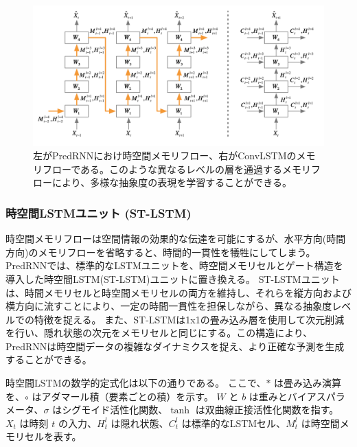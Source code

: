         \begin{figure}[htbp]
          \begin{center}
            \includegraphics[width=\textwidth]{figures/videoprediction/predrnn_memory.png}
            \caption{左がPredRNNにおけ時空間メモリフロー、右がConvLSTMのメモリフローである。このような異なるレベルの層を通過するメモリフローにより、多様な抽象度の表現を学習することができる。}
            \label{fig:predrnn}
          \end{center}
        \end{figure}
        
        \subsubsection{時空間LSTMユニット (ST-LSTM)}
          時空間メモリフローは空間情報の効果的な伝達を可能にするが、水平方向(時間方向)のメモリフローを省略すると、時間的一貫性を犠牲にしてしまう。
          PredRNNでは、標準的なLSTMユニットを、時空間メモリセルとゲート構造を導入した時空間LSTM(ST-LSTM)ユニットに置き換える。
          ST-LSTMユニットは、時間メモリセルと時空間メモリセルの両方を維持し、それらを縦方向および横方向に流すことにより、一定の時間一貫性を担保しながら、異なる抽象度レベルでの特徴を捉える。
          また、ST-LSTMは1x1の畳み込み層を使用して次元削減を行い、隠れ状態の次元をメモリセルと同じにする。この構造により、PredRNNは時空間データの複雑なダイナミクスを捉え、より正確な予測を生成することができる。

          時空間LSTMの数学的定式化は以下の通りである。
          ここで、\( \ast \) は畳み込み演算を、\( \circ \) はアダマール積（要素ごとの積）を示す。
          \( W \) と \( b \) は重みとバイアスパラメータ、\( \sigma \) はシグモイド活性化関数、\( \tanh \) は双曲線正接活性化関数を指す。
          \( X_t \) は時刻 \( t \) の入力、\( H_t^l \) は隠れ状態、\( C_t^l \) は標準的なLSTMセル、\( M_t^l \) は時空間メモリセルを表す。
          
